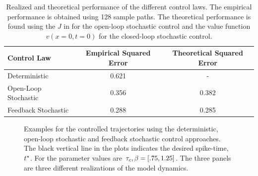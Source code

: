 \documentclass{article}
\begin{document}
\begin{table}[h] 
\centering
\begin{tabular}{lcc}
Control Law & Empirical Squared Error & Theoretical Squared Error \\
\hline
Deterministic &  0.621 & - \\
Open-Loop Stochastic & 0.356 & 0.382\\
Feedback Stochastic &  0.288& 0.285\\
\hline
\end{tabular}
\caption{Realized and theoretical performance of the different control laws. The empirical
performance is obtained using 128 sample paths. The theoretical performance is
found using the $J$ in for the open-loop stochastic control and the value
function $v(x=0, t =0)$ for the closed-loop stochastic control.}
\label{tab:realized_avg_errors_det_vs_openloop_vs_stoch}
\end{table}
\begin{figure}[h]
\begin{center}
\caption[]{Examples for the controlled trajectories using the deterministic,
open-loop stochastic and feedback stochastic control approaches. The
black vertical line in the plots indicates the desired spike-time, ${ t^* }$.
For the parameter values are ${ \tau_{c} }, {\beta} = [.75, 1.25]$. The three panels are
three different realizations of the model dynamics.}
\label{fig:control_trajectories_examples}
\end{center}
\end{figure}
\end{document}
